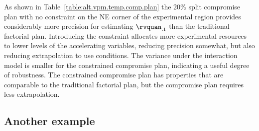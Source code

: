 \begin{example}
As shown in Table~\ref{table:alt.vpm.temp.comp.plan} the 20\% split
compromise plan with no constraint on the NE corner of the
experimental region provides considerably more precision for
estimating $\rvquan_{.1}$ than the traditional factorial plan.
Introducing the constraint allocates more experimental resources to
lower levels of the accelerating variables, reducing precision
somewhat, but also reducing extrapolation to use conditions. The
variance under the interaction model is smaller for the constrained
compromise plan, indicating a useful degree of robustness. The
constrained compromise plan has properties that are comparable to
the traditional factorial plan, but the compromise plan requires
less extrapolation.
\end{example}

\subsection{Another example}

